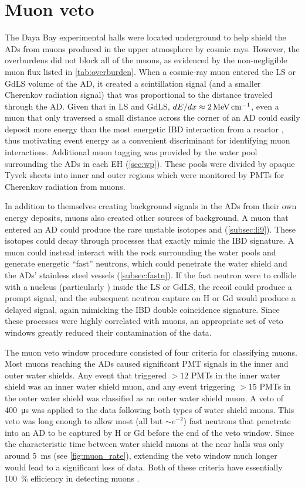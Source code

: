 \section{Muon veto}
\label{sec:muonveto}

The Daya Bay experimental halls were located underground
to help shield the ADs from muons produced in the upper atmosphere by cosmic rays.
However, the overburdens did not block all of the muons,
as evidenced by the non-negligible muon flux listed in \cref{tab:overburden}.
When a cosmic-ray muon entered the LS or GdLS volume of the AD,
it created a scintillation signal (and a smaller Cherenkov radiation signal)
that was proportional to the distance traveled
through the AD.
Given that in LS and GdLS, $dE/dx \approx \SI{2}{\mev\per\cm}$,
even a muon that only traversed a small distance across the corner of an AD could easily deposit
more energy than the most energetic IBD interaction from a reactor \nuebar,
thus motivating event energy as a convenient discriminant for identifying muon interactions.
Additional muon tagging was provided by the water pool
surrounding the ADs in each EH (\cref{sec:wp}).
These pools were divided by opaque Tyvek sheets into inner and outer regions
which were monitored by PMTs for Cherenkov radiation from muons.

In addition to themselves creating background signals in the ADs
from their own energy deposits,
muons also created other sources of background.
A muon that entered an AD could produce
the rare unstable isotopes \li{} and \he{} (\cref{subsec:li9}).
These isotopes could decay through processes that exactly mimic the IBD signature.
A muon could instead interact with the rock surrounding the water pools
and generate energetic ``fast'' neutrons,
which could penetrate the water shield and the ADs' stainless steel vessels
(\cref{subsec:fastn}).
If the fast neutron were to collide with a nucleus (particularly )
inside the LS or GdLS,
the recoil could produce a prompt signal,
and the subsequent neutron capture on H or Gd would produce
a delayed signal, again mimicking the IBD double coincidence signature.
Since these processes were highly correlated with muons,
an appropriate set of veto windows greatly reduced their contamination of the data.

The muon veto window procedure consisted of four criteria
for classifying muons.
Most muons reaching the ADs caused significant PMT signals in the inner and outer water shields.
Any event that triggered $>12$ PMTs in the inner water shield
was an inner water shield muon,
and any event triggering $>15$ PMTs in the outer water shield
was classified as an outer water shield muon.
A veto of \SI{400}{\micro\second} was applied to the data following
both types of water shield muons.
This veto was long enough to allow most (all but ${\sim}e^{-2}$)
fast neutrons that penetrate into an AD to be captured by H or Gd
before the end of the veto window.
Since the characteristic time between water shield muons at the near halls
was only around \SI{5}{\milli\second} (see \cref{fig:muon_rate}),
extending the veto window much longer would lead to a significant
loss of data.
Both of these criteria have essentially \SI{100}{\percent} efficiency
in detecting muons \cite{muonsystem2015}.

